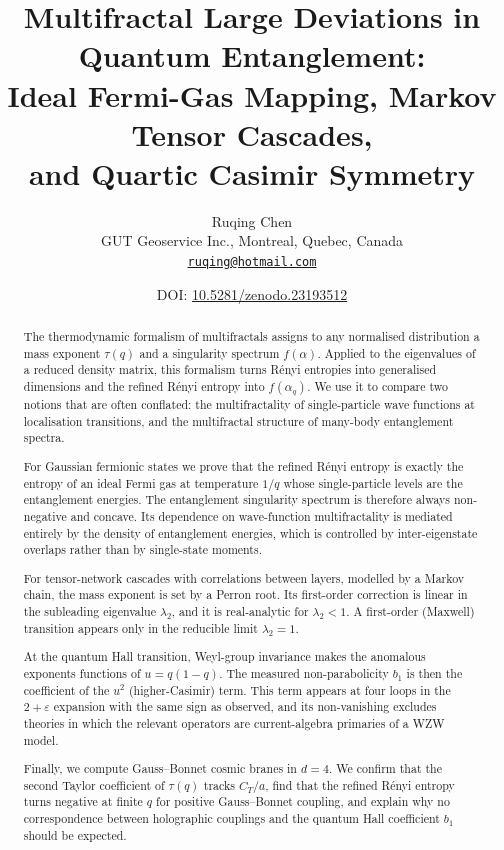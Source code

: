 \documentclass[11pt]{article}
\title{Multifractal Large Deviations in Quantum Entanglement:\\
Ideal Fermi-Gas Mapping, Markov Tensor Cascades,\\ and Quartic Casimir Symmetry}
\author{Ruqing Chen\\[2pt]
\small GUT Geoservice Inc., Montreal, Quebec, Canada\\
\small \href{mailto:ruqing@hotmail.com}{\texttt{ruqing@hotmail.com}}}
\date{\small DOI: \href{https://doi.org/10.5281/zenodo.23193512}{10.5281/zenodo.23193512}}
\theoremstyle{definition}\newtheorem{definition}{Definition}[section]
\theoremstyle{remark}\newtheorem*{remark}{Remark}
\begin{document}
\maketitle

\begin{abstract}
The thermodynamic formalism of multifractals assigns to any normalised distribution a mass exponent
$\tau(q)$ and a singularity spectrum $f(\alpha)$. Applied to the eigenvalues of a reduced density matrix,
this formalism turns R\'enyi entropies into generalised dimensions and the refined R\'enyi entropy into
$f(\alpha_q)$. We use it to compare two notions that are often conflated: the multifractality of
single-particle wave functions at localisation transitions, and the multifractal structure of many-body
entanglement spectra.

For Gaussian fermionic states we prove that the refined R\'enyi entropy is exactly the entropy of an ideal
Fermi gas at temperature $1/q$ whose single-particle levels are the entanglement energies. The entanglement
singularity spectrum is therefore always non-negative and concave. Its dependence on wave-function
multifractality is mediated entirely by the density of entanglement energies, which is controlled by
inter-eigenstate overlaps rather than by single-state moments.

For tensor-network cascades with correlations between layers, modelled by a Markov chain, the mass exponent
is set by a Perron root. Its first-order correction is linear in the subleading eigenvalue $\lambda_2$, and it
is real-analytic for $\lambda_2<1$. A first-order (Maxwell) transition appears only in the reducible limit
$\lambda_2=1$.

At the quantum Hall transition, Weyl-group invariance makes the anomalous exponents functions of
$u=q(1-q)$. The measured non-parabolicity $b_1$ is then the coefficient of the $u^2$ (higher-Casimir) term.
This term appears at four loops in the $2+\varepsilon$ expansion with the same sign as observed, and its
non-vanishing excludes theories in which the relevant operators are current-algebra primaries of a WZW
model.

Finally, we compute Gauss--Bonnet cosmic branes in $d=4$. We confirm that the second Taylor coefficient of
$\tau(q)$ tracks $C_T/a$, find that the refined R\'enyi entropy turns negative at finite $q$ for positive
Gauss--Bonnet coupling, and explain why no correspondence between holographic couplings and the quantum Hall
coefficient $b_1$ should be expected.
\end{abstract}
\end{document}
